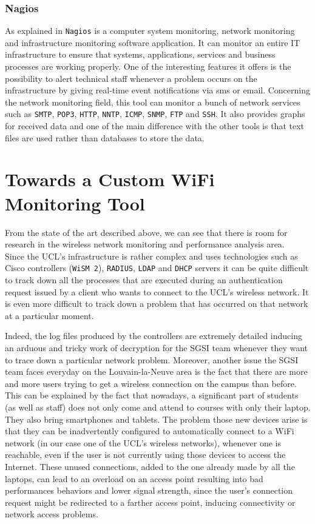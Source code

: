 \subsubsection{Nagios}
As explained in \cite{nagios} \texttt{Nagios} is a computer system monitoring, network monitoring and infrastructure monitoring software application. It can monitor an entire IT infrastructure to ensure that systems, applications, services and business processes are working properly. One of the interesting features it offers is the possibility to alert technical staff whenever a problem occurs on the infrastructure by giving real-time event notifications via sms or email. Concerning the network monitoring field, this tool can monitor a bunch of network services such as \texttt{SMTP}, \texttt{POP3}, \texttt{HTTP}, \texttt{NNTP}, \texttt{ICMP}, \texttt{SNMP}, \texttt{FTP} and \texttt{SSH}. It also provides graphs for received data and one of the main difference with the other tools is that text files are used rather than databases to store the data.


\section{Towards a Custom WiFi Monitoring Tool}
From the state of the art described above, we can see that there is room for research in the wireless network monitoring and performance analysis area.\\
Since the UCL's infrastructure is rather complex and uses technologies such as Cisco controllers (\texttt{WiSM 2}), \texttt{RADIUS}, \texttt{LDAP} and \texttt{DHCP} servers it can be quite difficult to track down all the processes that are executed during an authentication request issued by a client who wants to connect to the UCL's wireless network. It is even more difficult to track down a problem that has occurred on that network at a particular moment.

Indeed, the log files produced by the controllers are extremely detailed inducing an arduous and tricky work of decryption for the SGSI team whenever they want to trace down a particular network problem. Moreover, another issue the SGSI team faces everyday on the Louvain-la-Neuve area is the fact that there are more and more users trying to get a wireless connection on the campus than before. This can be explained by the fact that nowadays, a significant part of students (as well as staff) does not only come and attend to courses with only their laptop. They also bring smartphones and tablets. The problem those new devices arise is that they can be inadvertently configured to automatically connect to a WiFi network (in our case one of the UCL's wireless networks), whenever one is reachable, even if the user is not currently using those devices to access the Internet. These unused connections, added to the one already made by all the laptops, can lead to an overload on an access point resulting into bad performances behaviors and lower signal strength, since the user's connection request might be redirected to a farther access point, inducing connectivity or network access problems.

